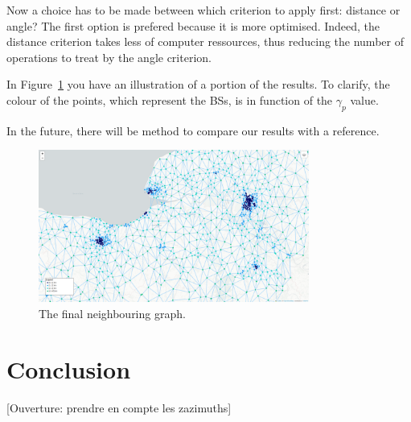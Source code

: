 \documentclass[lettersize,journal,english]{IEEEtran}
\begin{document}
        Now a choice has to be made between which criterion to apply first: distance or angle? The first option is prefered because it is more optimised. Indeed, the distance criterion takes less of computer ressources, thus reducing the number of operations to treat by the angle criterion.

        In Figure~\ref{fig:final_neighs} you have an illustration of a portion of the results. To clarify, the colour of the points, which represent the BSs, is in function of the $\gamma_p$ value.

        In the future, there will be method to compare our results with a reference.
        \begin{figure}
            \centering
            \includegraphics[width=3.5in]{images/illus_graphs/final_neighs_del_da.png}
            \caption{The final neighbouring graph.}
            \label{fig:final_neighs}
        \end{figure}

\section{Conclusion\label{sec:ccl}}
    [Ouverture: prendre en compte les zazimuths]



\end{document}
